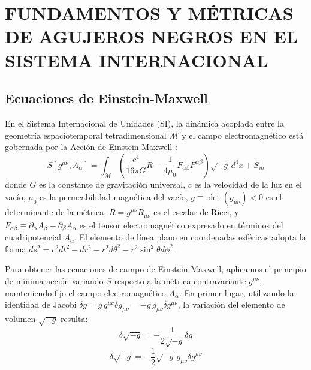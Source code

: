 \chapter{FUNDAMENTOS Y MÉTRICAS DE AGUJEROS NEGROS EN EL SISTEMA INTERNACIONAL}

\section{Ecuaciones de Einstein-Maxwell }

En el Sistema Internacional de Unidades (SI), la dinámica acoplada entre la geometría espaciotemporal tetradimensional $\mathcal{M}$ y el campo electromagnético está gobernada por la Acción de Einstein-Maxwell \citep{M_P_Hobson_General_Relativity, Sean_Carroll_Spacetime, 05villegas}:
\begin{equation}
    S[g^{\mu\nu}, A_\alpha] = \int_{\mathcal{M}} \left( \frac{c^4}{16\pi G} R - \frac{1}{4\mu_0} F_{\alpha\beta}F^{\alpha\beta} \right) \sqrt{-g} \, d^4x + S_m
    \label{eq:accion_EM_SI}
\end{equation}
donde $G$ es la constante de gravitación universal, $c$ es la velocidad de la luz en el vacío, $\mu_0$ es la permeabilidad magnética del vacío, $g \equiv \det(g_{\mu\nu}) < 0$ es el determinante de la métrica, $R = g^{\mu\nu} R_{\mu\nu}$ es el escalar de Ricci, y $F_{\alpha\beta} \equiv \partial_\alpha A_\beta - \partial_\beta A_\alpha$ es el tensor electromagnético expresado en términos del cuadripotencial $A_\alpha$. El elemento de línea plano en coordenadas esféricas adopta la forma $ds^2 = c^2 dt^2 - dr^2 - r^2 d\theta^2 - r^2 \sin^2\theta d\phi^2$ \citep{M_P_Hobson_General_Relativity, 05villegas}.

Para obtener las ecuaciones de campo de Einstein-Maxwell, aplicamos el principio de mínima acción variando $S$ respecto a la métrica contravariante $g^{\mu\nu}$, manteniendo fijo el campo electromagnético $A_\alpha$. En primer lugar, utilizando la identidad de Jacobi $\delta g = g \, g^{\mu\nu} \delta g_{\mu\nu} = -g \, g_{\mu\nu} \delta g^{\mu\nu}$, la variación del elemento de volumen $\sqrt{-g}$ resulta:
\begin{equation}
    \delta \sqrt{-g} = -\frac{1}{2\sqrt{-g}} \delta g
    \label{eq:var_vol_1}
\end{equation}
\begin{equation}
    \delta \sqrt{-g} = -\frac{1}{2} \sqrt{-g} \, g_{\mu\nu} \delta g^{\mu\nu}
    \label{eq:var_vol_2}
\end{equation}

